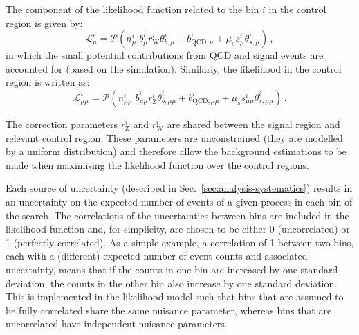 The component of the likelihood function related to the \njnbht bin $i$ in the 
\mj control region is given by:
\begin{equation}
\mathcal{L}_\mu^i = \mathcal{P}\left( n_\mu^i \bigg\rvert 
b_\mu^i r_{\mathrm{W}}^i \theta_{b,\mu}^i + 
b_{\mathrm{QCD},\mu}^i + 
\mu_s s_\mu^i \theta_{s,\mu}^i \right) \, ,
\end{equation}
in which the small potential contributions from QCD and signal events are 
accounted for (based on the simulation). 
Similarly, the likelihood in the \mmj control region is written as:
\begin{equation}
\mathcal{L}_{\mu\mu}^i = \mathcal{P}\left( n_{\mu\mu}^i \bigg\rvert 
b_{\mu\mu}^i r_{\mathrm{Z}}^i \theta_{b,\mu\mu}^i + 
b_{\mathrm{QCD},\mu\mu}^i + 
\mu_s s_{\mu\mu}^i \theta_{s,\mu\mu}^i \right) \, .
\end{equation}

The correction parameters $r_{\mathrm{Z}}^i$ and $r_{\mathrm{W}}^i$ are shared 
between the signal region and relevant control region. These parameters are 
unconstrained (they are modelled by a uniform distribution) and therefore allow 
the background estimations to be made when maximising the likelihood function 
over the control regions.

Each source of uncertainty (described in Sec.~\ref{sec:analysis-systematics}) 
results in an uncertainty on the expected number of events of 
a given process in each bin of the search. 
The correlations of the uncertainties between bins are included in the 
likelihood function and, for simplicity, are chosen to be either 
0 (uncorrelated) or 1 (perfectly correlated). As a simple 
example, a correlation of 1 between two bins, each with a (different) expected 
number of event counts and associated uncertainty, means that if the counts in 
one bin are increased by one standard deviation, the counts in the other bin 
also increase by one standard deviation. This is implemented in the likelihood 
model such that bins that are assumed to be fully correlated share the same 
nuisance parameter, whereas bins that are uncorrelated have independent 
nuisance parameters.

